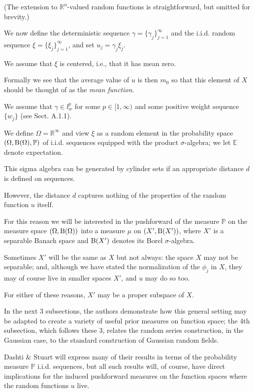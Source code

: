 \documentclass[oneside,11pt]{book}
\numberwithin{equation}{section}
\begin{document}
(The extension to $\mathbb{R}^n$-valued random functions is straightforward, but omitted for brevity.)

%
We now define the deterministic sequence $\gamma = \{\gamma_j\}_{j=1}^\infty$ and the i.i.d. random sequence $\xi = \{\xi_j\}_{j=1}^\infty$, and set $u_j = \gamma_j\xi_j$.

We assume that $\xi$ is centered, i.e., that it has mean zero.

Formally we see that the average value of $u$ is then $m_0$ so that this element of $X$ should be thought of as the \textit{mean function}.

We assume that $\gamma\in l_w^p$ for some $p\in[1,\infty)$ and some positive weight sequence $\{w_j\}$ (see Sect. A.1.1).

We define $\Omega = \mathbb{R}^\infty$ and view $\xi$ as a random element in the probability space $(\Omega,{\rm B}(\Omega),\mathbb{P})$ of i.i.d. sequences equipped with the product $\sigma$-algebra; we let $\mathbb{E}$ denote expectation.

This sigma algebra can be generated by cylinder sets if an appropriate distance $d$ is defined on sequences.

However, the distance $d$ captures nothing of the properties of the random function $u$ itself.

For this reason we will be interested in the pushforward of the measure $\mathbb{P}$ on the measure space $(\Omega,{\rm B}(\Omega))$ into a measure $\mu$ on $(X',{\rm B}(X'))$, where $X'$ is a separable Banach space and ${\rm B}(X')$ denotes its Borel $\sigma$-algebra.

Sometimes $X'$ will be the same as $X$ but not always: the space $X$ may not be separable; and, although we have stated the normalization of the $\phi_j$ in $X$, they may of course live in smaller spaces $X'$, and $u$ may do so too.

For either of these reasons, $X'$ may be a proper subspace of $X$.

%
In the next 3 subsections, the authors demonstrate how this general setting may be adapted to create a variety of useful prior measures on function space; the 4th subsection, which follows these 3, relates the random series construction, in the Gaussian case, to the standard construction of Gaussian random fields.

Dashti \& Stuart will express many of their results in terms of the probability measure $\mathbb{P}$ i.i.d. sequences, but all such results will, of course, have direct implications for the induced pushforward measures on the function spaces where the random functions $u$ live.
\end{document}
